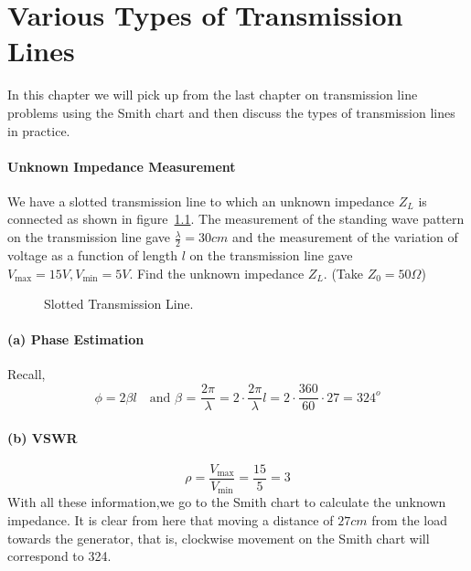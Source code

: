 \chapter{Various Types of Transmission Lines}\label{lec:lec15}
In this chapter we will pick up from the last chapter on transmission line problems using the Smith chart and then discuss the types of transmission lines in practice. 

\begin{exmp}
\subsubsection*{Unknown Impedance Measurement}
We have a slotted transmission line to which an unknown impedance $Z_L$ is connected as shown in figure~\ref{fig:fig3}. The measurement of the standing wave pattern on the transmission line gave $\frac{\lambda}{2}=30cm$ and the measurement of the variation of voltage as a function of length $l$ on the transmission line gave $V_\max=15V,V_\min=5V$. Find the unknown impedance $Z_L$. (Take $Z_0 = 50\varOmega$)
\begin{figure}[h]
\centering
\caption{Slotted Transmission Line.}
\label{fig:fig3}
\end{figure}

\subsubsection*{(a) Phase Estimation}
Recall,
\begin{dmath*}
\phi=2\beta l\quad\text{and }\beta\text{ = }\dfrac{2\pi}{\lambda}
=2\cdot\dfrac{2\pi}{\lambda} l
=2\cdot\dfrac{360}{60}\cdot27
=324^{o}
\end{dmath*}
\subsubsection*{(b) VSWR}
\begin{equation*}
\rho=\frac{V_\max}{V_\min}=\frac{15}{5}=3
\end{equation*}
With all these information,we go to the Smith chart to calculate the unknown impedance. It is clear from here that moving a distance of $27cm$ from the load towards the generator, that is, clockwise movement on the Smith chart will correspond to 324\textdegree.


\end{exmp}
